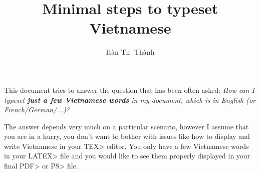 \documentclass[a4paper,12pt]{article}
\begin{document}
\title{\bfseries Minimal steps to typeset Vietnamese}
\author{\selectfont H\`an Th\'\ecircumflex{} Th\`anh}
\maketitle

This document tries to answer the question that has been often asked:
\textit{How can I typeset \textbf{just a few Vietnamese words} in my
document, which is in English (or French/German/...)?}

The answer depends very much on a particular scenario, however I
assume that you are in a hurry, you don't want to bother with issues like
how to display and write Vietnamese in your \<TEX>  editor. You only have a few
Vietnamese words in your \<LATEX> file and you would like to see them
properly displayed in your final \<PDF> or \<PS> file.
\end{document}
